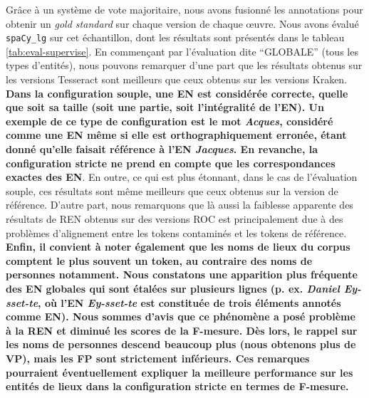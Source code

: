Grâce à un système de vote majoritaire, nous avons fusionné les annotations pour obtenir un \textit{gold standard} sur chaque version de chaque œuvre.
 Nous avons évalué \texttt{spaCy\_lg} sur cet échantillon, dont les résultats sont présentés dans le tableau \ref{tab:eval-supervise}.
 En commençant par l'évaluation dite ``GLOBALE'' (tous les types d'entités), nous pouvons remarquer d'une part que les résultats obtenus sur les versions Tesseract sont meilleurs que ceux obtenus sur les versions Kraken. 
  \textbf{Dans la configuration \og{}souple\fg{}, une EN est considérée correcte, quelle que soit sa taille (soit une partie, soit l'intégralité de l'EN). Un exemple de ce type de configuration est le mot \textit{Acques}, considéré comme une EN même si elle est orthographiquement erronée, étant donné qu'elle faisait référence à l'EN \textit{Jacques}. En revanche, la configuration \og{}stricte\fg{} ne prend en compte que les correspondances exactes des EN}.
  En outre, ce qui est plus étonnant, dans le cas de l'évaluation souple, ces résultats sont même meilleurs que ceux obtenus sur la version de référence.
  D'autre part, nous remarquons que là aussi la faiblesse apparente des résultats de REN obtenus sur des versions ROC est principalement due à des problèmes d'alignement entre les tokens contaminés et les tokens de référence. 
  \textbf{Enfin, il convient à noter également que les noms de lieux du corpus comptent le plus souvent un token, au contraire des noms de personnes notamment. Nous constatons une apparition plus fréquente des EN \og{}globales\fg{} qui sont étalées sur plusieurs lignes (p. ex. \textit{Daniel Ey-sset-te}, où l'EN \textit{Ey-sset-te} est constituée de trois éléments annotés comme EN). Nous sommes d'avis que ce phénomène a posé problème à la REN et diminué les scores de la F-mesure. Dès lors, le rappel sur les noms de personnes descend beaucoup plus (nous obtenons plus de VP), mais les FP sont strictement inférieurs. Ces remarques pourraient éventuellement expliquer la meilleure performance sur les entités de lieux dans la configuration stricte en termes de F-mesure.}
